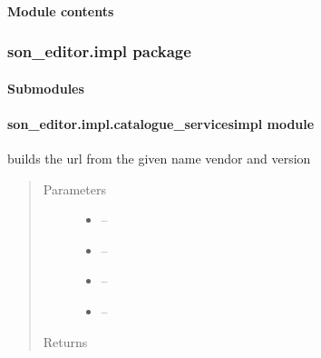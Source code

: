 \documentclass[letterpaper,10pt,english]{sphinxmanual}
\begin{document}
\paragraph{Module contents}
\label{_source/son_editor.app:module-son_editor.app}\label{_source/son_editor.app:module-contents}

\subsubsection{son\_editor.impl package}
\label{_source/son_editor.impl::doc}\label{_source/son_editor.impl:son-editor-impl-package}

\paragraph{Submodules}
\label{_source/son_editor.impl:submodules}

\paragraph{son\_editor.impl.catalogue\_servicesimpl module}
\label{_source/son_editor.impl:son-editor-impl-catalogue-servicesimpl-module}\label{_source/son_editor.impl:module-son_editor.impl.catalogue_servicesimpl}

\begin{fulllineitems}
\label{_source/son_editor.impl:son_editor.impl.catalogue_servicesimpl.build_URL}
builds the url from the given name vendor and version
\begin{quote}\begin{description}
\item[{Parameters}] \leavevmode\begin{itemize}
\item {} 
 -- 

\item {} 
 -- 

\item {} 
 -- 

\item {} 
 -- 

\end{itemize}

\item[{Returns}] \leavevmode


\end{description}\end{quote}

\end{fulllineitems}
\end{document}
